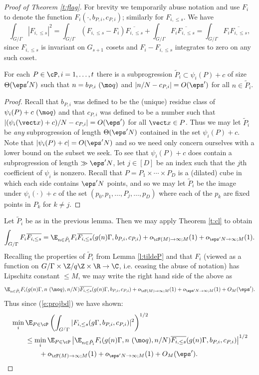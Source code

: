 \begin{proof}[Proof of Theorem \ref{t:flag}]
For brevity we temporarily abuse notation and use $F_{i}$ to denote the function $F_i(\cdot, b_{P,i},c_{P,i})$; similarly for  $F_{i,\leq s}$. We have 
\[\int_{G/\Gamma} |F_{i,\leq s}|^2 = \int_{G/\Gamma}(F_{i,\leq s} - F_i)\overline{F_{i,\leq s}} + \int_{G/\Gamma}F_i\overline{F_{i,\leq s}} = \int_{G/\Gamma}  F_i\overline{F_{i,\leq s}}, \] 
since $F_{i,\leq s}$ is invariant on $G_{s+1}$ cosets and $F_i-F_{i,\leq s}$ integrates to zero on any such coset. 

\begin{lemma}\label{l:tildeP}
For each $P \in \cP, i=1,\ldots, t$ there is a subprogression $\tilde P_i \subset \psi_i(P)+c$ of size  $\Theta(\eps' N)$ such that $n  = b_{P,i} \ (\mo q)$ and $|n/N - c_{P,i}|=O(\eps')$ for all $n \in \tilde P_i$.
\end{lemma}
\begin{proof}
Recall that $b_{P,i}$ was defined to be the (unique) residue class of $\psi_i(P) + c \ (\mo q)$ and that $c_{P,i}$ was defined to be a number such that $|(\psi_i(\vect x) + c)/N-c_{P,i}| = O(\eps')$ for all $\vect x \in P$.  Thus we may let $\tilde P_i$ be \textit{any} subprogression of length $\Theta(\eps' N)$ contained in the set $\psi_i(P)+c$. Note that $|\psi_i(P) + c| = O(\eps'N)$ and so we need only concern ourselves with a lower bound on the subset we seek. To see that $\psi_i(P)+c$ does contain a subprogression of length $\gg \eps' N$, let $j\in [D]$ be an index such that the $j$th coefficient of $\psi_i$ is nonzero. Recall that $P=P_1 \times \cdots \times P_D$ is a (dilated) cube in which each side contains $\eps' N$ points, and so we may let $\tilde P_i$ be the image under $\psi_i(\cdot) + c$ of the set $(p_0,p_1,\ldots, P_j, \ldots, p_D)$ where each of the $p_k$ are fixed points in $P_k$ for $k \ne j$.
\end{proof}

Let $\tilde P_i$ be as in the previous lemma. Then we may apply Theorem \ref{t:cl} to obtain 
\[ \int_{G/\Gamma}  F_i\overline{F_{i,\leq s}} = \E_{n\in \tilde P_i} F_i\overline{F_{i,\leq s}}( g(n) \Gamma, b_{P,i},c_{P,i}) + o_{\cF(M) \to \infty ; M}(1) + o_{\eps'N\to \infty;M}(1). \]
Recalling the properties of $\tilde P_i$ from Lemma \ref{l:tildeP} and that $F_i$ (viewed as a function on $G/\Gamma \times  \Z/q\Z \times \R \to \C$, i.e. ceasing the abuse of notation) has Lipschitz constant $\leq M$, we may write the right hand side of the above as 
\[ \E_{n\in \tilde P_i} F_i( g(n) \Gamma, n \ (\mo q), n/N)\overline{F_{i,\leq s}}( g(n) \Gamma, b_{P,i},c_{P,i}) + o_{\cF(M) \to \infty ; M}(1) + o_{\eps'N\to \infty;M}(1) + O_M(\eps'). \]
Thus since (\ref{e:projbd}) we have shown: 
\begin{align}\label{e:progAgain}
 & \min_i \E_{P\in \cP} \left(\int_{G^/\Gamma} |F_{i,\leq s}(g\Gamma, b_{P,i}, c_{P,i})|^2\right)^{1/2} \nonumber \\ &\qquad \leq \min_i \E_{P \in \cP}\left|\E_{n\in \tilde P_i} F_i( g(n) \Gamma, n \ (\mo q), n/N)\overline{F_{i,\leq s}}( g(n) \Gamma, b_{P,i},c_{P,i})\right|^{1/2}\\ \nonumber
 & \qquad \qquad + o_{\cF(M) \to \infty ; M}(1) + o_{\eps'N\to \infty;M}(1) + O_M(\eps').
\end{align}



\end{proof}

